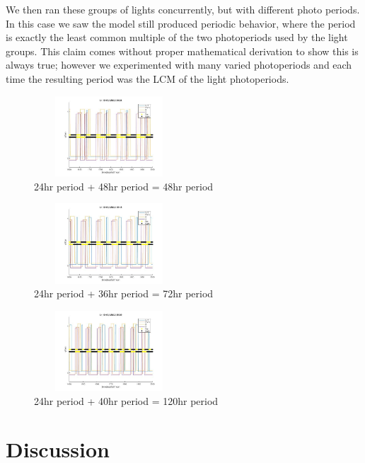 \documentclass[twoside,twocolumn,9pt]{article}
\begin{document}
We then ran these groups of lights concurrently, but with different photo periods. In this case we saw the model still produced periodic behavior, where the period is exactly the least common multiple of the two photoperiods used by the light groups. This claim comes without proper mathematical derivation to show this is always true; however we experimented with many varied photoperiods and each time the resulting period was the LCM of the light photoperiods.

\begin{figure}[H]
\centering
  \includegraphics[width=0.5\textwidth,height=3cm]{async1}
  \caption{24hr period + 48hr period = 48hr period}
  \label{fgr:async1}
\end{figure}
\begin{figure}[H]
\centering
  \includegraphics[width=0.5\textwidth,height=3cm]{async2}
  \caption{24hr period + 36hr period = 72hr period}
  \label{fgr:async2}
\end{figure}

\begin{figure}[H]
\centering
  \includegraphics[width=0.5\textwidth,height=3cm]{async3}
  \caption{24hr period + 40hr period = 120hr period}
  \label{fgr:async3}
\end{figure}


\section{Discussion}
\end{document}
